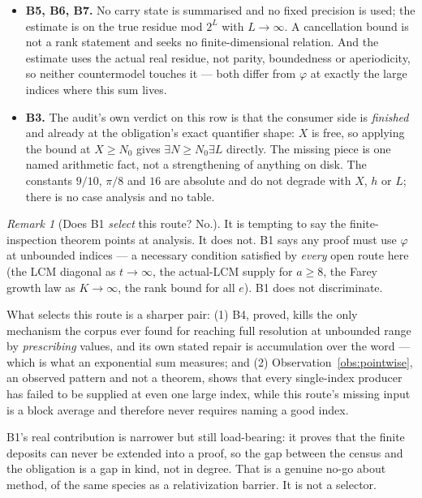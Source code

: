 \documentclass[11pt]{article}
\theoremstyle{plain}
\theoremstyle{definition}
\theoremstyle{remark}
\newtheorem{rem}[thm]{Remark}
\begin{document}
\begin{itemize}[leftmargin=*]
  (Remark~\ref{rem:b4}) is to impose the structure on the word rather than on
  one delta, which is exactly what a block exponential-sum bound does.
\item \textbf{B5, B6, B7.} No carry state is summarised and no fixed precision
  is used; the estimate is on the true residue mod $2^{L}$ with $L \to \infty$.
  A cancellation bound is not a rank statement and seeks no finite-dimensional
  relation. And the estimate uses the actual real residue, not parity,
  boundedness or aperiodicity, so neither countermodel touches it --- both
  differ from $\varphi$ at exactly the large indices where this sum lives.
\item \textbf{B3.} The audit's own verdict on this row is that the consumer
  side is \emph{finished} and already at the obligation's exact quantifier
  shape: $X$ is free, so applying the bound at $X \ge N_0$ gives
  $\exists N \ge N_0 \exists L$ directly. The missing piece is one named
  arithmetic fact, not a strengthening of anything on disk. The constants
  $9/10$, $\pi/8$ and $16$ are absolute and do not degrade with $X$, $h$ or
  $L$; there is no case analysis and no table.
\end{itemize}

\begin{rem}[Does B1 \emph{select} this route? No.]
\label{rem:b1-not-selector}
It is tempting to say the finite-inspection theorem points at analysis. It does
not. B1 says any proof must use $\varphi$ at unbounded indices --- a necessary
condition satisfied by \emph{every} open route here (the LCM diagonal as
$t \to \infty$, the actual-LCM supply for $a \ge 8$, the Farey growth law as
$K \to \infty$, the rank bound for all $e$). B1 does not discriminate.

\par\medskip

What selects this route is a sharper pair: (1) B4, proved, kills the only mechanism
the corpus ever found for reaching full resolution at unbounded range by
\emph{prescribing} values, and its own stated repair is accumulation over the
word --- which is what an exponential sum measures; and (2)
Observation~\ref{obs:pointwise}, an observed pattern and not a theorem, shows
that every single-index producer has failed to be supplied at even one large
index, while this route's missing input is a block average and therefore never
requires naming a good index.

\par\medskip

B1's real contribution is narrower but still load-bearing: it proves that the finite deposits can never be extended into a
proof, so the gap between the census and the obligation is a gap in kind, not
in degree. That is a genuine no-go about method, of the same species as a
relativization barrier. It is not a selector.
\end{rem}
\end{document}
